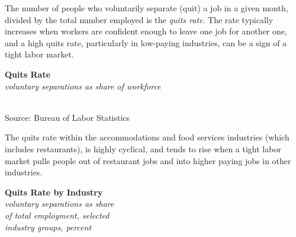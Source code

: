 \documentclass{report}
\makeatletter
\newcommand{\tbllink}[1]{\href{https://raw.githubusercontent.com/bdecon/US-chartbook/master/chartbook/data/#1}{\faTable}}
\newcommand*\short[1]{\expandafter\@gobbletwo\number\numexpr#1\relax}
\newcommand{\stdnode}[3]{\node[below, align=left, shift=({#1,#2})]{#3};}
\newcommand{\shdateaxisticks}{
		date coordinates in=x, axis line style={draw=none},
		xmax={2021-02-01},
		max space between ticks=40,	    
		xtick={{1990-01-01}, {1995-01-01}, {2000-01-01}, 
			{2005-01-01}, {2010-01-01}, {2015-01-01}, {2020-01-01}},
		minor xtick={},
		enlarge y limits={0.06}, enlarge x limits={0.01},
		}
\newcommand{\bbar}[2]{extra #1 ticks = {{#2}}, extra #1 tick labels = ,
		extra #1 tick style = {grid=major, grid style={thick, black!25}},}
\newcommand{\stdline}[4]{\addplot[very thick, no markers, color=#1] 
		table [x=#2, y=#3, col sep=comma] {#4};	}
\newcommand{\rebars}{
		\fill[color=black!10] (axis cs:{2007-12-01},\pgfkeysvalueof{/pgfplots/ymin}) rectangle 
			(axis cs:{2009-07-01}, \pgfkeysvalueof{/pgfplots/ymax});
		\fill[color=black!10] (axis cs:{2001-03-01},\pgfkeysvalueof{/pgfplots/ymin}) rectangle 
			(axis cs:{2001-11-01}, \pgfkeysvalueof{/pgfplots/ymax});}
\makeatother
\begin{document}
{{{{{{{{{\begin{minipage}{0.76\textwidth}

\small The number of people who voluntarily separate (quit) a job in a given month, divided by the total number employed is the \textit{quits rate}. The rate typically increases when workers are confident enough to leave one job for another one, and a high quits rate, particularly in low-paying industries, can be a sign of a tight labor market.
\end{minipage}
\vspace{1mm}

\begin{minipage}{0.38\textwidth}
\noindent \normalsize \textbf{Quits Rate}\\
\footnotesize{\textit{voluntary separations as share of workforce}}\\ 
\noindent \hspace*{-2mm} \\
\footnotesize{Source: Bureau of Labor Statistics} \hspace{14mm} \tbllink{quits.csv}\\
\end{minipage}
\hspace{9mm}
\begin{minipage}{0.31\textwidth}
\small The quits rate within the accommodations and food services industries (which includes restaurants), is highly cyclical, and tends to rise when a tight labor market pulls people out of restaurant jobs and into higher paying jobs in other industries. 
\end{minipage}

\newpage

\begin{minipage}{0.42\textwidth}
\noindent \normalsize \textbf{Quits Rate by Industry}\\
\footnotesize{\textit{voluntary separations as share }}\\
\footnotesize{\textit{of total employment, selected }}\\
\footnotesize{\textit{industry groups, percent}}\\
\vspace{9.7cm}


\end{minipage}}}}}}}}}}
\end{document}
